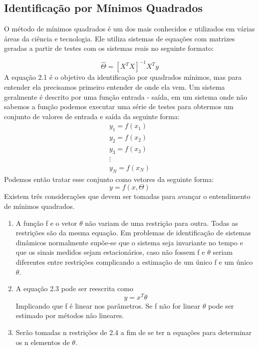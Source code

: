 \subsection{Identificação por Mínimos Quadrados}
O método de mínimos quadrados é um dos mais conhecidos e utilizados em várias áreas da ciência e tecnologia. Ele utiliza sistemas de equações com matrizes geradas a partir de testes com os sistemas reais no seguinte formato:


\begin{equation}
	\hat{\Theta}=[X^TX]^{-1}X^Ty
\end{equation}
A equação 2.1 é o objetivo da identificação por quadrados mínimos, mas para entender ela precisamos primeiro entender de onde ela vem.
\newline 
Um sistema geralmente é descrito por uma função entrada - saída, em um sistema onde não sabemos a função podemos executar uma série de testes para obtermos um conjunto de valores de entrada e saída da seguinte forma:
\begin{equation}
\begin{array}{c}
y_1=f(x_1) \\
y_2=f(x_2) \\
y_3=f(x_3) \\
\vdots \\
y_N=f(x_N)
\end{array}
\end{equation}
Podemos então tratar esse conjunto como vetores da seguinte forma:
\begin{equation}
y=f(x,\Theta)
\end{equation}
Existem três considerações que devem ser tomadas para avançar o entendimento de mínimos quadrados.
\begin{enumerate}
	\item A função f e o vetor $\theta$ não variam de uma restrição para outra. Todas as restrições são da mesma equação. Em problemas de identificação de sistemas dinâmicos normalmente supõe-se que o sistema seja invariante no tempo e que os sinais medidos sejam estacionários, caso não fossem f e $\theta$ seriam diferentes entre restrições complicando a estimação de um único f e um único $\theta$.
	\item A equação 2.3 pode ser reescrita como
	\begin{equation}
	y=x^T \theta
	\end{equation}
	Implicando que f é linear nos parâmetros. Se f não for linear $\theta$ pode ser estimado por métodos não lineares.
	\item Serão tomadas n restrições de 2.4 a fim de se ter n equações para determinar os n elementos de $\theta$.
\end{enumerate}

